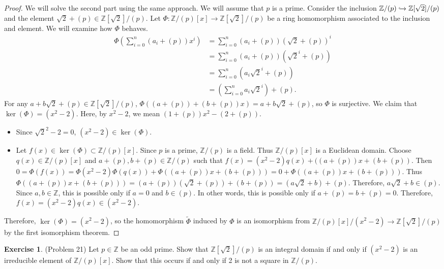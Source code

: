 \documentclass[12pt, psamsfonts]{amsart}
\theoremstyle{definition}
\newtheorem*{exer}{Exercise}
\theoremstyle{remark}
\numberwithin{equation}{section}
\begin{document}
\begin{proof}
  We will solve the second part using the same approach.
  We will assume that $p$ is a prime.
  Consider the inclusion $\mathbb{Z}/(p) \xhookrightarrow{} \mathbb{Z}[\sqrt{2}]/(p)$ and the element $\sqrt{2} + (p) \in \mathbb{Z}[\sqrt{2}]/(p)$.
  Let $\Phi: \mathbb{Z}/(p)[x] \rightarrow \mathbb{Z}[\sqrt{2}]/(p)$ be a ring homomorphism associated to the inclusion and element.
  We will examine how $\Phi$ behaves.
  \begin{align*}
    \Phi(\sum_{i=0}^{n}(a_i + (p))x^i)
      &= \sum_{i=0}^{n}(a_i + (p))(\sqrt{2} + (p))^i \\
      &= \sum_{i=0}^{n}(a_i + (p))(\sqrt{2}^i + (p)) \\
      &= \sum_{i=0}^{n}(a_i \sqrt{2}^i + (p)) \\
      &= (\sum_{i=0}^{n} a_i\sqrt{2}^i) + (p).
  \end{align*}
  For any $a + b\sqrt{2} + (p) \in \mathbb{Z}[\sqrt{2}]/(p)$, $\Phi((a + (p)) + (b + (p))x) = a + b\sqrt{2} + (p)$, so $\Phi$ is surjective.
  We claim that $\ker(\Phi) = (x^2 - 2)$.
  Here, by $x^2 - 2$, we mean $(1 + (p))x^2 - (2 + (p))$.
  \begin{itemize}
    \item
      Since $\sqrt{2}^2 - 2 = 0$, $(x^2 - 2) \in \ker(\Phi)$.
    \item
      Let $f(x) \in \ker(\Phi) \subset \mathbb{Z}/(p)[x]$.
      Since $p$ is a prime, $\mathbb{Z}/(p)$ is a field.
      Thus $\mathbb{Z}/(p)[x]$ is a Euclidean domain.
      Choose $q(x) \in \mathbb{Z}/(p)[x]$ and $a + (p), b + (p) \in \mathbb{Z}/(p)$ such that $f(x) = (x^2 - 2)q(x) + ((a + (p))x + (b + (p))$.
      Then $0 = \Phi(f(x)) = \Phi(x^2 - 2)\Phi(q(x)) + \Phi((a + (p))x + (b + (p))) = 0 + \Phi((a + (p))x + (b + (p)))$.
      Thus $\Phi((a + (p))x + (b + (p))) = (a + (p))(\sqrt{2} + (p)) + (b + (p)) = (a\sqrt{2} + b) + (p)$.
      Therefore, $a\sqrt{2} + b \in (p)$.
      Since $a, b \in \mathbb{Z}$, this is possible only if $a = 0$ and $b \in (p)$.
      In other words, this is possible only if $a + (p) = b + (p) = 0$.
      Therefore, $f(x) = (x^2 - 2)q(x) \in (x^2 - 2)$.
  \end{itemize}
  Therefore, $\ker(\Phi) = (x^2 - 2)$, so the homomorphism $\tilde{\Phi}$ induced by $\Phi$ is an isomorphism from $\mathbb{Z}/(p)[x]/(x^2 - 2) \rightarrow \mathbb{Z}[\sqrt{2}]/(p)$ by the first isomorphism theorem.
\end{proof}

\begin{exer}{(Problem 21)}
  Let $p \in \mathbb{Z}$ be an odd prime.
  Show that $\mathbb{Z}[\sqrt{2}]/(p)$ is an integral domain if and only if $(x^2 - 2)$ is an irreducible element of $\mathbb{Z}/(p)[x]$.
  Show that this occurs if and only if 2 is not a square in $\mathbb{Z}/(p)$.
\end{exer}
\end{document}
